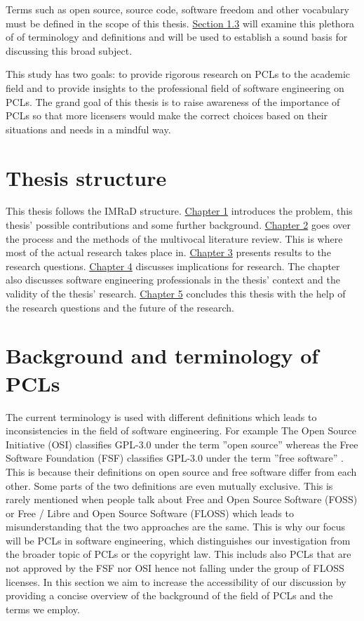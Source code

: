 Terms such as open source, source code, software freedom and other vocabulary must be defined in the scope of this thesis. \hyperref[sec:bg]{Section 1.3} will examine this plethora of of terminology and definitions and will be used to establish a sound basis for discussing this broad subject.

This study has two goals: to provide rigorous research on PCLs to the academic field and to provide insights to the professional field of software engineering on PCLs. The grand goal of this thesis is to raise awareness of the importance of PCLs so that more licensers would make the correct choices based on their situations and needs in a mindful way.

\section{Thesis structure}
This thesis follows the IMRaD structure. \hyperref[intro]{Chapter 1} introduces the problem, this thesis' possible contributions and some further background. \hyperref[methods]{Chapter 2} goes over the process and the methods of the multivocal literature review. This is where most of the actual research takes place in. \hyperref[results]{Chapter 3} presents results to the research questions. \hyperref[discussion]{Chapter 4} discusses implications for research. The chapter also discusses software engineering professionals in the thesis' context and the validity of the thesis' research. \hyperref[conclusions]{Chapter 5} concludes this thesis with the help of the research questions and the future of the research.

\section{Background and terminology of PCLs}
\label{sec:bg}
The current terminology is used with different definitions which leads to inconsistencies in the field of software engineering. For example The Open Source Initiative (OSI) classifies GPL-3.0 under the term ''open source'' whereas the Free Software Foundation (FSF) classifies GPL-3.0 under the term ''free software'' . This is because their definitions on open source and free software differ from each other. Some parts of the two definitions are even mutually exclusive. This is rarely mentioned when people talk about Free and Open Source Software (FOSS) or Free / Libre and Open Source Software (FLOSS) which leads to misunderstanding that the two approaches are the same. This is why our focus will be PCLs in software engineering, which distinguishes our investigation from the broader topic of PCLs or the copyright law. This includs also PCLs that are not approved by the FSF nor OSI hence not falling under the group of FLOSS licenses. In this section we aim to increase the accessibility of our discussion by providing  a concise overview of the background of the field of PCLs and the terms we employ.

